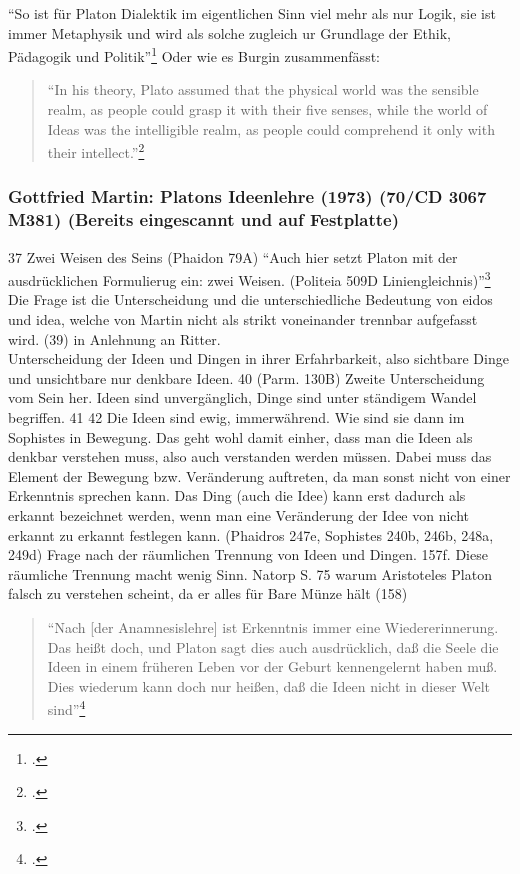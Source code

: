 \documentclass[12pt]{article}
\newcommand*{\zitatblock}[1]{%
    \begin{quote}
    \fontsize{10}{12}\selectfont
    \setlength{\parskip}{1.0em}
    #1
    \end{quote}
}
\begin{document}
\enquote{So ist für Platon Dialektik im eigentlichen Sinn viel mehr als nur Logik, sie ist immer Metaphysik und wird als solche zugleich ur Grundlage der Ethik, Pädagogik und Politik}\footcite[][S. 108]{Hirschberger}
Oder wie es Burgin zusammenfässt: \zitatblock{\enquote{In his theory, Plato assumed that the physical world was the sensible realm, as people could grasp it with their five senses, while the world of Ideas was the intelligible realm, as people could comprehend it only with their intellect.}\footcite[][S. 179]{Burgin}}
\subsubsection*{Gottfried Martin: Platons Ideenlehre (1973) (70/CD 3067 M381) (Bereits eingescannt und auf Festplatte)}
37 Zwei Weisen des Seins (Phaidon 79A)
\enquote{Auch hier setzt Platon mit der ausdrücklichen Formulierug ein: zwei Weisen. (Politeia 509D Liniengleichnis)}\footcite[][S. 39]{Martin73}
Die Frage ist die Unterscheidung und die unterschiedliche Bedeutung von eidos und idea, welche von Martin nicht als strikt voneinander trennbar aufgefasst wird. (39) in Anlehnung an Ritter.\\
Unterscheidung der Ideen und Dingen in ihrer Erfahrbarkeit, also sichtbare Dinge und unsichtbare nur denkbare Ideen. 40 (Parm. 130B) Zweite Unterscheidung vom Sein her. Ideen sind unvergänglich, Dinge sind unter ständigem Wandel begriffen. 41
42 Die Ideen sind ewig, immerwährend. Wie sind sie dann im Sophistes in Bewegung. Das geht wohl damit einher, dass man die Ideen als denkbar verstehen muss, also auch verstanden werden müssen. Dabei muss das Element der Bewegung bzw. Veränderung auftreten, da man sonst nicht von einer Erkenntnis sprechen kann. Das Ding (auch die Idee) kann erst dadurch als erkannt bezeichnet werden, wenn man eine Veränderung der Idee von nicht erkannt zu erkannt festlegen kann. (Phaidros 247e, Sophistes 240b, 246b, 248a, 249d)
Frage nach der räumlichen Trennung von Ideen und Dingen. 157f. Diese räumliche Trennung macht wenig Sinn.
Natorp S. 75 warum Aristoteles Platon falsch zu verstehen scheint, da er alles für Bare Münze hält (158)
\zitatblock{\enquote{Nach [der Anamnesislehre] ist Erkenntnis immer eine Wiedererinnerung. Das heißt doch, und Platon sagt dies auch ausdrücklich, daß die Seele die Ideen in einem früheren Leben vor der Geburt kennengelernt haben muß. Dies wiederum kann doch nur heißen, daß die Ideen nicht in dieser Welt sind}\footcite[][S. 160]{Martin73}}
\end{document}
